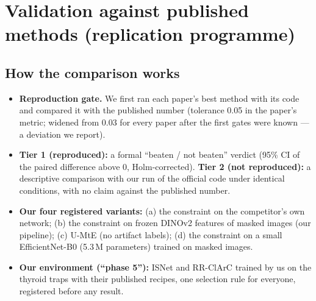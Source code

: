 \section{Validation against published methods (replication programme)}\label{sec:replication}

\subsection{How the comparison works}
\begin{itemize}[leftmargin=*]
\item \textbf{Reproduction gate.} We first ran each paper's best method with its code and compared it with the published
number (tolerance 0.05 in the paper's metric; widened from 0.03 for every paper after the first gates were known --- a
deviation we report).
\item \textbf{Tier 1 (reproduced):} a formal ``beaten / not beaten'' verdict (95\% CI of the paired difference above 0,
Holm-corrected). \textbf{Tier 2 (not reproduced):} a descriptive comparison with our run of the official code under
identical conditions, with no claim against the published number.
\item \textbf{Our four registered variants:} (a) the constraint on the competitor's own network; (b) the constraint on
frozen DINOv2 features of masked images (our pipeline); (c) U-MtE (no artifact labels); (d) the constraint on a small
EfficientNet-B0 (5.3\,M parameters) trained on masked images.
\item \textbf{Our environment (``phase 5''):} ISNet and RR-ClArC trained by us on the thyroid traps with their published
recipes, one selection rule for everyone, registered before any result.
\end{itemize}

